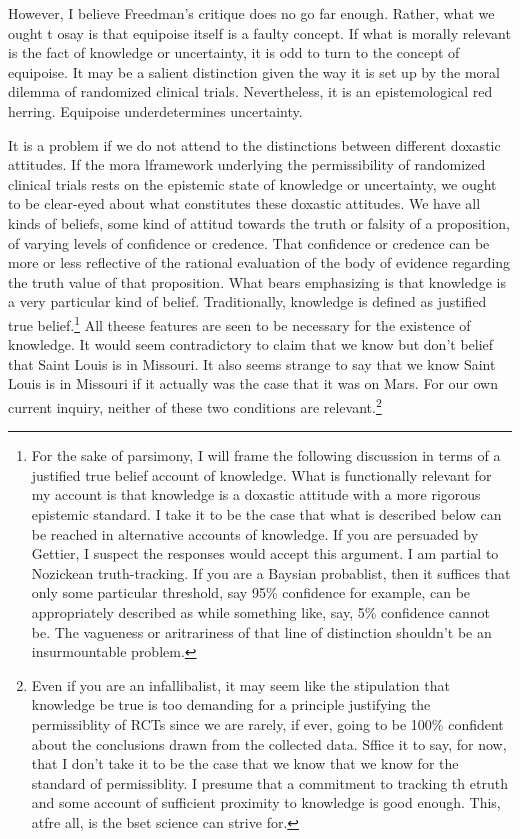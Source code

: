 \documentclass[letterpaper,notitlepage,12pt]{article}
\begin{document}
However, I believe Freedman's critique does no go far enough.
Rather, what we ought t osay is that equipoise itself is a faulty concept.
If what is morally relevant is the fact of knowledge or uncertainty, it is odd
to turn to the concept of equipoise.
It may be a salient distinction given the way it is set up by the moral dilemma
of randomized clinical trials.
Nevertheless, it is an epistemological red herring.
Equipoise underdetermines uncertainty.

It is a problem if we do not attend to the distinctions between different
doxastic attitudes.
If the mora lframework underlying the permissibility of randomized clinical
trials rests on the epistemic state of knowledge or uncertainty, we ought to be
clear-eyed about what constitutes these doxastic attitudes.
We have all kinds of beliefs, some kind of attitud towards the truth or falsity
of a proposition, of varying levels of confidence or credence.
That confidence or credence can be more or less reflective of the rational
evaluation of the body of evidence regarding the truth value of that
proposition.
What bears emphasizing is that knowledge is a very particular kind of belief.
Traditionally, knowledge is defined as justified true belief.\footnote{For the
  sake of parsimony, I will frame the following discussion in terms of a
  justified true belief account of knowledge. What is functionally relevant for
  my account is that knowledge is a doxastic attitude with a more rigorous
  epistemic standard. I take it to be the case that what is described below can
  be reached in alternative accounts of knowledge. If you are persuaded by
  Gettier, I suspect the responses would accept this argument. I am partial to
  Nozickean truth-tracking. If you are a Baysian probablist, then it suffices
  that only some particular threshold, say 95\% confidence for example, can be
  appropriately described as  while something like, say,
  5\% confidence cannot be. The vagueness or aritrariness of that line of
distinction shouldn't be an insurmountable problem.}
All theese features are seen to be necessary for the existence of knowledge.
It would seem contradictory to claim that we know but don't belief that Saint
Louis is in Missouri.
It also seems strange to say that we know Saint Louis is in Missouri if it
actually was the case that it was on Mars.
For our own current inquiry, neither of these two conditions are
relevant.\footnote{Even if you are an infallibalist, it may seem like the
  stipulation that knowledge be true is too demanding for a principle justifying
  the permissiblity of RCTs since we are rarely, if ever, going to be 100\%
  confident about the conclusions drawn from the collected data. Sffice it to
  say, for now, that I don't take it to be the case that we know that we know
  for the standard of permissiblity. I presume that a commitment to tracking th
  etruth and some account of sufficient proximity to knowledge is good enough.
  This, atfre all, is the bset science can strive for.}
\end{document}
